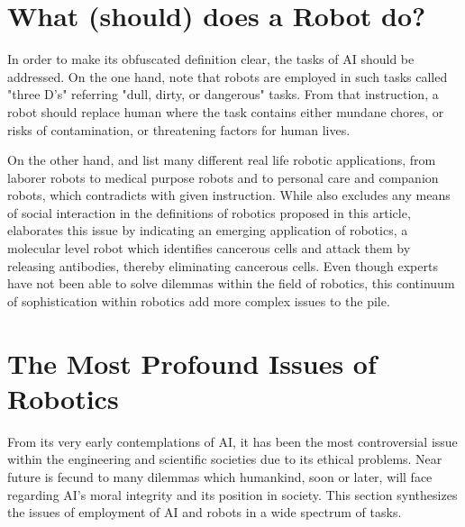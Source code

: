 \documentclass[man]{apa6}
\begin{document}
\section{What (should) does a Robot do?}
In order to make its obfuscated definition clear, the tasks of AI should be addressed.
On the one hand,   note that robots are employed in such tasks called "three D's" referring "dull, dirty, or dangerous" tasks.
From that instruction, a robot should replace human where the task contains either mundane chores, or risks of contamination, or threatening factors for human lives.
\par 
\par
On the other hand,  and  list many different real life robotic applications, from laborer robots to medical purpose robots and to personal care and companion robots, which contradicts with given instruction.
While  also excludes any means of social interaction in the definitions of robotics proposed in this article,  elaborates this issue by indicating an emerging application of robotics, a molecular level robot which identifies cancerous cells and attack them by releasing antibodies, thereby eliminating cancerous cells.
Even though experts have not been able to solve dilemmas within the field of robotics, this continuum of sophistication within robotics add more complex issues to the pile.
\par
\section{The Most Profound Issues of Robotics}
From its very early contemplations of AI, it has been the most controversial issue within the engineering and scientific societies due to its ethical problems.
Near future is fecund to many dilemmas which humankind, soon or later, will face regarding AI's moral integrity and its position in society.
This section synthesizes the issues of employment of AI and robots in a wide spectrum of tasks.
\end{document}
